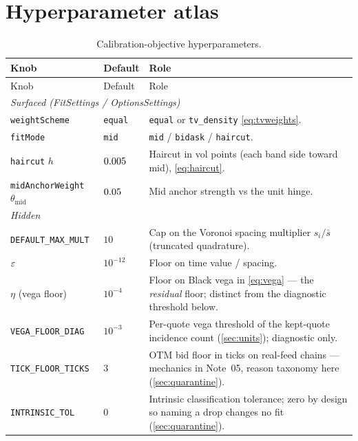 \documentclass[11pt]{article}
\begin{document}
\appendix
\section{Hyperparameter atlas}
\label{app:atlas}

\begin{longtable}{p{}p{}p{}}
\caption{Calibration-objective hyperparameters.}\label{tab:atlas}\\
\toprule Knob & Default & Role\\ \midrule
\endfirsthead \toprule Knob & Default & Role\\ \midrule \endhead
\multicolumn{3}{l}{\emph{Surfaced (FitSettings / OptionsSettings)}}\\ \midrule
\texttt{weightScheme} & \texttt{equal} & \texttt{equal} or
\texttt{tv\_density} \eqref{eq:tvweights}.\\
\texttt{fitMode} & \texttt{mid} & \texttt{mid} / \texttt{bidask} /
\texttt{haircut}.\\
\texttt{haircut} $h$ & $0.005$ & Haircut in vol points (each band
side toward mid), \eqref{eq:haircut}.\\
\texttt{midAnchorWeight} $\theta_{\mathrm{mid}}$ & $0.05$ & Mid
anchor strength vs the unit hinge.\\
\midrule
\multicolumn{3}{l}{\emph{Hidden}}\\ \midrule
\texttt{DEFAULT\_MAX\_MULT} & $10$ & Cap on the Voronoi spacing
multiplier $s_i/\bar s$ (truncated quadrature).\\
$\varepsilon$ & $10^{-12}$ & Floor on time value / spacing.\\
$\eta$ (vega floor) & $10^{-4}$ & Floor on Black vega in
\eqref{eq:vega} --- the \emph{residual} floor; distinct from the
diagnostic threshold below.\\
\texttt{VEGA\_FLOOR\_DIAG} & $10^{-3}$ & Per-quote vega threshold of the
kept-quote incidence count (\cref{sec:units}); diagnostic only.\\
\texttt{TICK\_FLOOR\_TICKS} & $3$ & OTM bid floor in ticks on real-feed
chains --- mechanics in Note~05, reason taxonomy here
(\cref{sec:quarantine}).\\
\texttt{INTRINSIC\_TOL} & $0$ & Intrinsic classification tolerance; zero
by design so naming a drop changes no fit (\cref{sec:quarantine}).\\
\bottomrule
\end{longtable}
\end{document}
